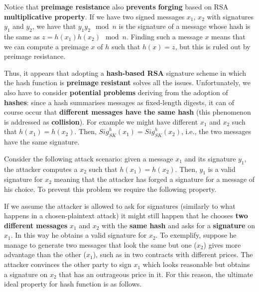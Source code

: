 Notice that \textbf{preimage resistance} also \textbf{prevents} \textbf{forging} based on RSA \textbf{multiplicative property}. If we have two signed messages $x_1$, $x_2$ with signatures $y_1$ and $y_2$, we have that $y_1 y_2 \mod n$ is the signature of a message whose hash is the same as $z = h(x_1) h(x_2) \mod n$. Finding such a message $x$ means that we can compute a preimage $x$ of $h$ such that $h(x) = z$, but this is ruled out by preimage resistance.

Thus, it appears that adopting a \textbf{hash-based RSA} signature scheme in which the hash function is \textbf{preimage} \textbf{resistant} solves all the issues. Unfortunately, we also have to consider \textbf{potential problems} deriving from the adoption of \textbf{hashes}: since a hash summarises messages as fixed-length digests, it can of course occur that \textbf{different messages have the same hash} (this phenomenon is addressed as \textbf{collision}). For example we might have different $x_1$ and $x_2$ such that $h(x_1) = h(x_2)$. Then, $\mathit{Sig}^h_{SK}(x_1) = \mathit{Sig}^h_{SK}(x_2)$, i.e., the two messages have the same signature.

Consider the following attack scenario: given a message $x_1$ and its signature $y_1$, the attacker computes a $x_2$ such that $h(x_1) = h(x_2)$. Then, $y_1$ is a valid signature for $x_2$ meaning that the attacker has forged a signature for a message of his choice. To prevent this problem we require the following property.


If we assume the attacker is allowed to ask for signatures (similarly to what happens in a chosen-plaintext attack) it might still happen that he chooses \textbf{two different messages} $x_1$ and $x_2$ with the \textbf{same hash} and asks for a \textbf{signature} on $x_1$. In this way he obtains a valid signature for $x_2$. To exemplify, suppose he manage to generate two messages that look the same but one ($x_2$) gives more advantage than the other ($x_1$), such as in two contracts with different prices. The attacker convinces the other party to sign $x_1$ which looks reasonable but obtains a signature on $x_2$ that has an outrageous price in it. For this reason, the ultimate ideal property for hash function is as follows.


